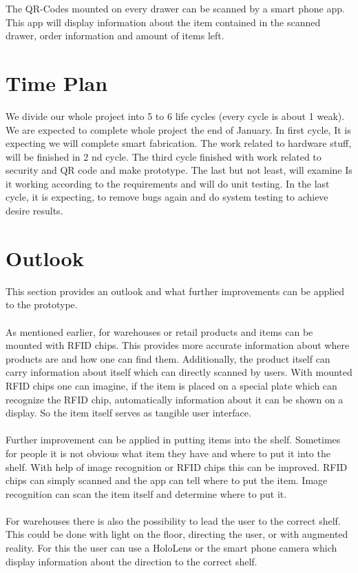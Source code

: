 \documentclass{sigchi}
\begin{document}
The QR-Codes mounted on every drawer can be scanned by a smart phone app. 
This app will display information about the item contained in the scanned drawer, order information and amount of items left. 


\section{Time Plan}
We divide our whole project into 5 to 6 life cycles (every cycle is about 1 weak).
We are expected to complete whole project the end of January. In first cycle, It is
expecting we will complete smart fabrication. The work related to hardware stuff,
will be finished in 2 nd cycle. The third cycle finished with work related to security
and QR code and make prototype. The last but not least, will examine Is it working
according to the requirements and will do unit testing. In the last cycle, it is
expecting, to remove bugs again and do system testing to achieve desire results.



\section{Outlook}
This section provides an outlook and what further improvements can be applied to the prototype. 
\\
\\
As mentioned earlier, for warehouses or retail products and items can be mounted with RFID chips. 
This provides more accurate information about where products are and how one can find them. 
Additionally, the product itself can carry information about itself which can directly scanned by users. 
With mounted RFID chips one can imagine, if the item is placed on a special plate which can recognize the RFID chip, automatically information about it can be shown on a display. 
So the item itself serves as tangible user interface. 
\\
\\
Further improvement can be applied in putting items into the shelf. 
Sometimes for people it is not obvious what item they have and where to put it into the shelf. 
With help of image recognition or RFID chips this can be improved. 
RFID chips can simply scanned and the app can tell where to put the item. 
Image recognition can scan the item itself and determine where to put it. 
\\
\\
For warehouses there is also the possibility to lead the user to the correct shelf. 
This could be done with light on the floor, directing the user, or with augmented reality. 
For this the user can use a HoloLens or the smart phone camera which display information about the direction to the correct shelf. 
\end{document}
